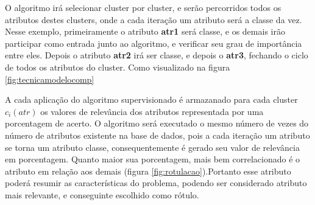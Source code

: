 O algoritmo irá selecionar cluster por cluster, e serão percorridos todos os atributos destes clusters, onde a cada iteração um atributo será a classe da vez. Nesse exemplo, primeiramente o atributo \textbf{atr1} será classe, e os demais irão participar como entrada junto ao algoritmo, e verificar seu grau de importância entre eles. Depois o atributo \textbf{atr2} irá ser classe, e depois o \textbf{atr3}, fechando o ciclo de todos os atributos do cluster. Como visualizado na figura \ref{fig:tecnicamodelocomp} 

A cada aplicação do algoritmo supervisionado é armazanado para cada cluster ${c_i(atr)}$  os valores de relevância dos atributos representada por uma porcentagem de acerto. O algoritmo será executado o mesmo número de vezes do número de atributos existente na base de dados, pois a cada iteração um atributo se torna um atributo classe, consequentemente é gerado seu valor de relevância em porcentagem. Quanto maior sua porcentagem, mais bem correlacionado é o atributo em relação aos demais (figura \ref{fig:rotulacao}).Portanto esse atributo poderá resumir as características do problema, podendo ser considerado atributo mais relevante, e conseguinte escolhido como rótulo.

